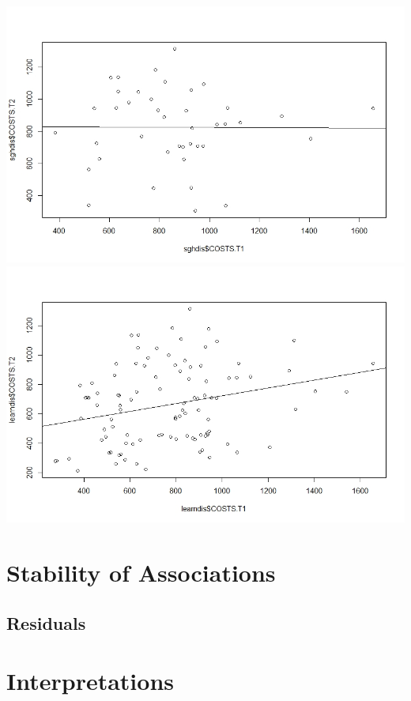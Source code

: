 \documentclass[11pt]{article}
\begin{document}
\includegraphics[width=15cm]{RStudio/jpeg/Reg SGH.jpeg}
\includegraphics[width=15cm]{RStudio/jpeg/Reg COST.jpeg}

%
\section{Stability of Associations}

\subsection{Residuals}

\section{Interpretations}
\end{document}

